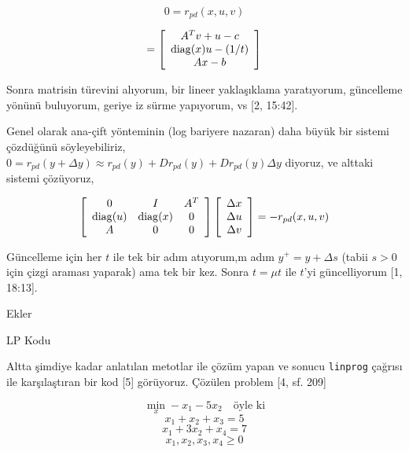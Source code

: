 \documentclass[12pt,fleqn]{article}\usepackage{../../common}
\begin{document}
$$
0 = r_{pd}(x,u,v)
$$

$$
= \left[\begin{array}{c}
A^T v + u - c \\
\operatorname{diag}(x) u - (1/t) \\
Ax - b
\end{array}\right]
$$

Sonra matrisin türevini alıyorum, bir lineer yaklaşıklama yaratıyorum,
güncelleme yönünü buluyorum, geriye iz sürme yapıyorum, vs [2, 15:42]. 


Genel olarak ana-çift yönteminin (log bariyere nazaran) daha büyük bir
sistemi çözdüğünü söyleyebiliriz, $0 = r_{pd}(y + \Delta y) \approx
r_{pd}(y) + D r_{pd}(y) + D r_{pd}(y) \Delta y$ diyoruz, ve alttaki sistemi
çözüyoruz, 

$$
\left[\begin{array}{ccc}
0 & I & A^T \\
\operatorname{diag}(u) & \operatorname{diag}(x) & 0 \\
A & 0 & 0 
\end{array}\right]
\left[\begin{array}{c}
\Delta x \\ \Delta u \\ \Delta v  
\end{array}\right] = -r_{pd}(x,u,v)
$$

Güncelleme için her $t$ ile tek bir adım atıyorum,m adım $y^+ = y + \Delta
s$ (tabii $s > 0$ için çizgi araması yaparak) ama tek bir kez. Sonra 
$t = \mu t$ ile $t$'yi güncelliyorum [1, 18:13]. 

Ekler

LP Kodu

Altta şimdiye kadar anlatılan metotlar ile çözüm yapan ve sonucu
\verb!linprog! çağrısı ile karşılaştıran bir kod [5] görüyoruz. Çözülen
problem [4, sf. 209]

$$
\min_x -x_1 - 5x_2 \quad \textrm{öyle ki}
$$
$$
x_1 + x_2 + x_3  = 5 
$$
$$
x_1 + 3 x_2 + x_4 = 7
$$
$$
x_1,x_2,x_3,x_4 \ge 0
$$


\inputminted[fontsize=\footnotesize]{python}{pdl.py}
\end{document}
